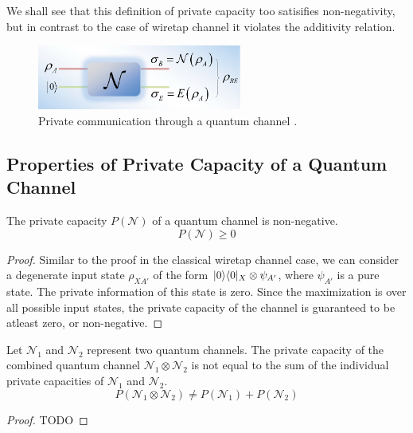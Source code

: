 We shall see that this definition of private capacity too satisifies non-negativity, but in contrast to the case of wiretap channel it violates the additivity relation.

\begin{figure}[H]
    \centering
    \includegraphics[width=0.6\textwidth]{figures/private_communication_quantum_channel.png}
    \caption{Private communication through a quantum channel \cite{Gyongyosi_2018}.}
\end{figure}

\subsection{Properties of Private Capacity of a Quantum Channel}

\begin{theorem}
The private capacity $P(\mathcal{N})$ of a quantum channel is non-negative.
$$P(\mathcal{N}) \geq 0$$
\end{theorem}

\begin{proof}
Similar to the proof in the classical wiretap channel case, we can consider a degenerate input state $\rho_{XA'}$ of the form $\lvert0\rangle\langle0\rvert_X \otimes \psi_{A'}$, where $\psi_{A'}$ is a pure state. The private information of this state is zero. Since the maximization is over all possible input states, the private capacity of the channel is guaranteed to be atleast zero, or non-negative.
\end{proof}

\begin{theorem}[Additivity]
Let $\mathcal{N}_1$ and $\mathcal{N}_2$ represent two quantum channels. The private capacity of the combined quantum channel $\mathcal{N}_1 \otimes \mathcal{N}_2$ is not equal to the sum of the individual private capacities of $\mathcal{N}_1$ and $\mathcal{N}_2$.
$$P(\mathcal{N}_1 \otimes \mathcal{N}_2) \neq P(\mathcal{N}_1) + P(\mathcal{N}_2)$$
\end{theorem}

\begin{proof}
TODO
\end{proof}
